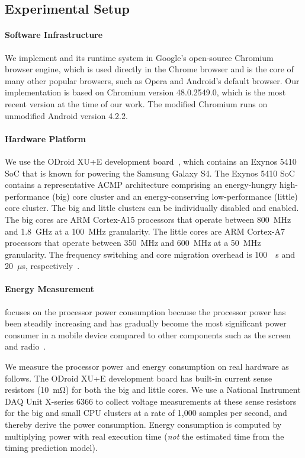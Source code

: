 \subsection{Experimental Setup}
\label{sec:runtime:ebs:setup}

\paragraph{Software Infrastructure} We implement \greenweb and its runtime system in Google's open-source Chromium browser engine, which is used directly in the Chrome browser and is the core of many other popular browsers, such as Opera and Android's default browser. Our implementation is based on Chromium version 48.0.2549.0, which is the most recent version at the time of our work. The modified Chromium runs on unmodified Android version 4.2.2.

\paragraph{Hardware Platform} We use the ODroid XU+E development board~\cite{odroidxue}, which contains an Exynos 5410 SoC that is known for powering the Samsung Galaxy S4. The Exynos 5410 SoC contains a representative ACMP architecture comprising an energy-hungry high-performance (big) core cluster and an energy-conserving low-performance (little) core cluster. The big and little clusters can be individually disabled and enabled. The big cores are ARM Cortex-A15 processors that operate between 800~MHz and 1.8~GHz at a 100~MHz granularity. The little cores are ARM Cortex-A7 processors that operate between 350~MHz and 600~MHz at a 50~MHz granularity. The frequency switching and core migration overhead is \SI{100}{\mu\second} and 20~$\mu$s, respectively~\cite{big-little,ebs}.

\paragraph{Energy Measurement}  \greenweb focuses on the processor power consumption because the processor power has been steadily increasing and has gradually become the most significant power consumer in a mobile device compared to other components such as the screen and radio~\cite{mobilecpu}.

We measure the processor power and energy consumption on real hardware as follows. The ODroid XU+E development board has built-in current sense resistors (\SI{10}{\milli\ohm}) for both the big and little cores. We use a National Instrument DAQ Unit X-series 6366 to collect voltage measurements at these sense resistors for the big and small CPU clusters at a rate of 1,000 samples per second, and thereby derive the power consumption. Energy consumption is computed by multiplying power with real execution time (\textit{not} the estimated time from the timing prediction model).

